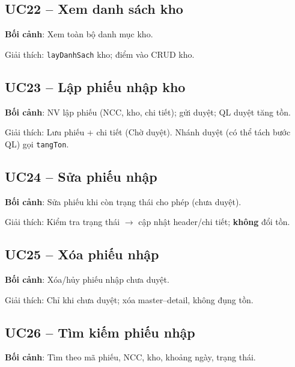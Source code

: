 \subsection{UC22 -- Xem danh sách kho}

\textbf{Bối cảnh}: Xem toàn bộ danh mục kho.



Giải thích: \texttt{layDanhSach} kho; điểm vào CRUD kho.

\subsection{UC23 -- Lập phiếu nhập kho}

\textbf{Bối cảnh}: NV lập phiếu (NCC, kho, chi tiết); gửi duyệt; QL duyệt tăng tồn.



Giải thích: Lưu phiếu + chi tiết (Chờ duyệt). Nhánh duyệt (có thể tách bước QL) gọi \texttt{tangTon}.

\subsection{UC24 -- Sửa phiếu nhập}

\textbf{Bối cảnh}: Sửa phiếu khi còn trạng thái cho phép (chưa duyệt).



Giải thích: Kiểm tra trạng thái $\rightarrow$ cập nhật header/chi tiết; \textbf{không} đổi tồn.

\subsection{UC25 -- Xóa phiếu nhập}

\textbf{Bối cảnh}: Xóa/hủy phiếu nhập chưa duyệt.



Giải thích: Chỉ khi chưa duyệt; xóa master--detail, không đụng tồn.

\subsection{UC26 -- Tìm kiếm phiếu nhập}

\textbf{Bối cảnh}: Tìm theo mã phiếu, NCC, kho, khoảng ngày, trạng thái.

